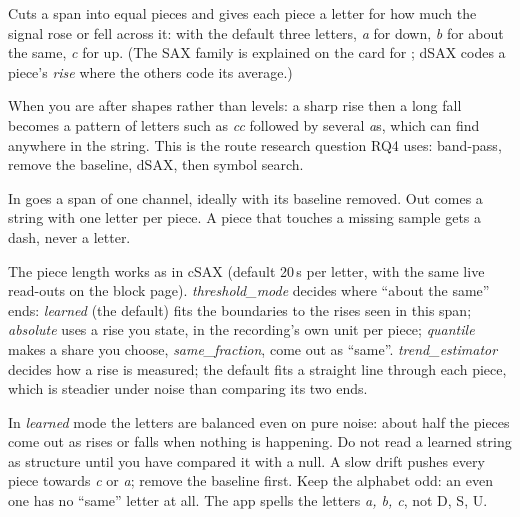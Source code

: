 Cuts a span into equal pieces and gives each piece a letter for how much the signal rose or
fell across it: with the default three letters, \emph{a} for down, \emph{b} for about the
same, \emph{c} for up. (The SAX family is explained on the card for
; dSAX codes a piece's \emph{rise} where the others code its
average.)

When you are after shapes rather than levels: a sharp rise then a long fall becomes a
pattern of letters such as \emph{cc} followed by several \emph{a}s, which
 can find anywhere in the string. This is the route
research question RQ4 uses: band-pass, remove the baseline, dSAX, then symbol search.

In goes a span of one channel, ideally with its baseline removed. Out comes a string with
one letter per piece. A piece that touches a missing sample gets a dash, never a letter.

The piece length works as in cSAX (default 20\,s per letter, with the same live read-outs on
the block page). \emph{threshold\_mode} decides where ``about the same'' ends:
\emph{learned} (the default) fits the boundaries to the rises seen in this span;
\emph{absolute} uses a rise you state, in the recording's own unit per piece;
\emph{quantile} makes a share you choose, \emph{same\_fraction}, come out as ``same''.
\emph{trend\_estimator} decides how a rise is measured; the default fits a straight line
through each piece, which is steadier under noise than comparing its two ends.

In \emph{learned} mode the letters are balanced even on pure noise: about half the pieces
come out as rises or falls when nothing is happening. Do not read a learned string as
structure until you have compared it with a null. A slow drift pushes every piece towards
\emph{c} or \emph{a}; remove the baseline first. Keep the alphabet odd: an even one has no
``same'' letter at all. The app spells the letters \emph{a, b, c}, not D, S, U.
